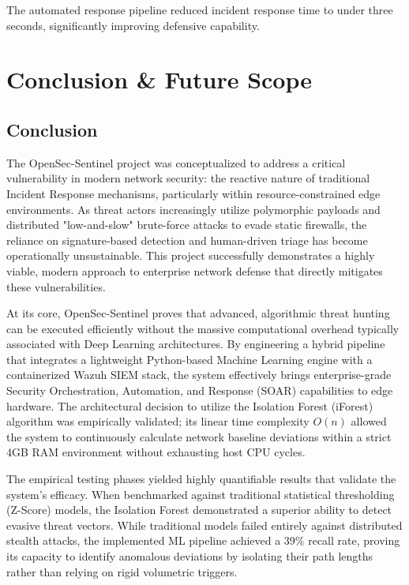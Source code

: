 \documentclass[12pt, a4paper]{report}
\begin{document}
	The automated response pipeline reduced incident response time to under
	three seconds, significantly improving defensive capability.
	
	\chapter{Conclusion \& Future Scope}
	\onehalfspacing
	
	\section{Conclusion}
	The OpenSec-Sentinel project was conceptualized to address a critical vulnerability in modern network security: the reactive nature of traditional Incident Response mechanisms, particularly within resource-constrained edge environments. As threat actors increasingly utilize polymorphic payloads and distributed "low-and-slow" brute-force attacks to evade static firewalls, the reliance on signature-based detection and human-driven triage has become operationally unsustainable. This project successfully demonstrates a highly viable, modern approach to enterprise network defense that directly mitigates these vulnerabilities.
	
	At its core, OpenSec-Sentinel proves that advanced, algorithmic threat hunting can be executed efficiently without the massive computational overhead typically associated with Deep Learning architectures. By engineering a hybrid pipeline that integrates a lightweight Python-based Machine Learning engine with a containerized Wazuh SIEM stack, the system effectively brings enterprise-grade Security Orchestration, Automation, and Response (SOAR) capabilities to edge hardware. The architectural decision to utilize the Isolation Forest (iForest) algorithm was empirically validated; its linear time complexity $O(n)$ allowed the system to continuously calculate network baseline deviations within a strict 4GB RAM environment without exhausting host CPU cycles.
	
	The empirical testing phases yielded highly quantifiable results that validate the system's efficacy. When benchmarked against traditional statistical thresholding (Z-Score) models, the Isolation Forest demonstrated a superior ability to detect evasive threat vectors. While traditional models failed entirely against distributed stealth attacks, the implemented ML pipeline achieved a 39\% recall rate, proving its capacity to identify anomalous deviations by isolating their path lengths rather than relying on rigid volumetric triggers.
	
\end{document}
